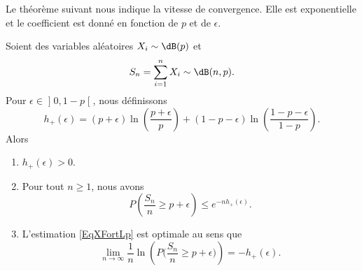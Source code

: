 Le théorème suivant nous indique la vitesse de convergence. Elle est exponentielle et le coefficient est donné en fonction de \( p\) et de \( \epsilon\).

\begin{theorem} \label{ThoYYaBXkU}
	Soient des variables aléatoires \( X_i\sim\dB(p)\) et
	\begin{equation}
		S_n=\sum_{i=1}^nX_i\sim\dB(n,p).
	\end{equation}
	Pour \( \epsilon\in\mathopen] 0 , 1-p \mathclose[\), nous définissons
	\begin{equation}
		h_+(\epsilon)=(p+\epsilon)\ln\left( \frac{ p+\epsilon }{ p } \right)+(1-p-\epsilon)\ln\left( \frac{ 1-p-\epsilon }{ 1-p } \right).
	\end{equation}
	Alors
	\begin{enumerate}
		\item\label{ItemUWyKcpMi}
		      \( h_+(\epsilon)>0\).
		\item\label{ItemUWyKcpMii}
		      Pour tout \( n\geq 1\), nous avons
		      \begin{equation}    \label{EqXFortLp}
			      P\left( \frac{ S_n }{ n }\geq p+\epsilon \right)\leq  e^{-nh_+(\epsilon)}.
		      \end{equation}
		\item\label{ItemUWyKcpMiii}
		      L'estimation \eqref{EqXFortLp} est optimale au sens que
		      \begin{equation}
			      \lim_{n\to \infty} \frac{1}{ n }\ln\left( P\big( \frac{ S_n }{ n } \geq p+\epsilon \big) \right)=-h_+(\epsilon).
		      \end{equation}
	\end{enumerate}
\end{theorem}

